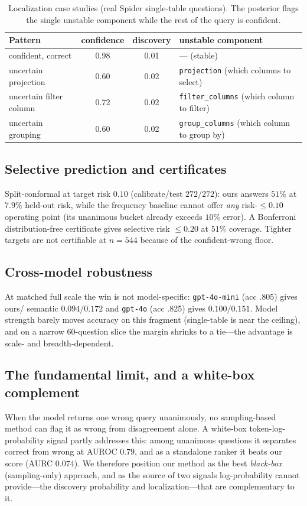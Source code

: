 \documentclass[11pt]{article}
\begin{document}
\begin{table}[t]
\centering
\caption{Localization case studies (real Spider single-table questions). The posterior flags the
single unstable component while the rest of the query is confident.}
\label{tab:loc}
\begin{tabular}{lccl}
\toprule
Pattern & confidence & discovery & unstable component\\
\midrule
confident, correct       & 0.98 & 0.01 & --- (stable)\\
uncertain projection     & 0.60 & 0.02 & \texttt{projection} (which columns to select)\\
uncertain filter column  & 0.72 & 0.02 & \texttt{filter\_columns} (which column to filter)\\
uncertain grouping       & 0.60 & 0.02 & \texttt{group\_columns} (which column to group by)\\
\bottomrule
\end{tabular}
\end{table}

\subsection{Selective prediction and certificates}
Split-conformal at target risk $0.10$ (calibrate/test $272/272$): ours answers $51\%$ at $7.9\%$
held-out risk, while the frequency baseline cannot offer \emph{any} risk-$\le0.10$ operating point
(its unanimous bucket already exceeds $10\%$ error). A Bonferroni distribution-free certificate
gives selective risk $\le0.20$ at $51\%$ coverage. Tighter targets are not certifiable at $n{=}544$
because of the confident-wrong floor.

\subsection{Cross-model robustness}
At matched full scale the win is not model-specific: \texttt{gpt-4o-mini} (acc .805) gives ours/%
semantic $0.094/0.172$ and \texttt{gpt-4o} (acc .825) gives $0.100/0.151$. Model strength barely
moves accuracy on this fragment (single-table is near the ceiling), and on a narrow 60-question slice
the margin shrinks to a tie---the advantage is scale- and breadth-dependent.

\subsection{The fundamental limit, and a white-box complement}
When the model returns one wrong query unanimously, no sampling-based method can flag it as wrong
from disagreement alone. A white-box token-log-probability signal partly addresses this: among
unanimous questions it separates correct from wrong at AUROC $0.79$, and as a standalone ranker it
beats our score (AURC $0.074$). We therefore position our method as the best \emph{black-box}
(sampling-only) approach, and as the source of two signals log-probability cannot provide---the
discovery probability and localization---that are complementary to it.
\end{document}
